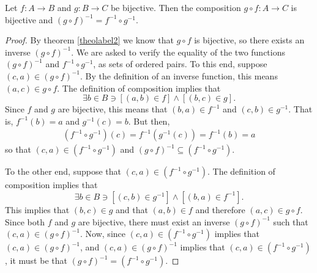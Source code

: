 \begin{theorem}
	Let $f:A\rightarrow B$ and $g:B\rightarrow C$ be bijective. Then the composition $g\circ f:A\rightarrow C$ is bijective and $(g\circ f)^{-1}=f^{-1}\circ g^{-1}$.
\end{theorem}

\begin{proof}
	By theorem \ref{theolabel2} we know that $g\circ f$ is bijective, so there exists an inverse $(g\circ f)^{-1}$. We are asked to verify the equality of the two functions $(g\circ f)^{-1}$ and $f^{-1}\circ g^{-1}$, as sets of ordered pairs. To this end, suppose $(c,a)\in (g\circ f)^{-1}$. By the definition of an inverse function, this means $(a,c)\in g\circ f$. The definition of composition implies that
	$$\exists b\in B \ni [(a,b)\in f]\land [(b,c)\in g].$$
	Since $f$ and $g$ are bijective, this means that $(b,a)\in f^{-1}$ and $(c,b)\in g^{-1}$. That is, $f^{-1}(b)=a$ and $g^{-1}(c)=b$. But then,
	\begin{align}
		(f^{-1}\circ g^{-1})(c)=f^{-1}(g^{-1}(c))=f^{-1}(b)=a
	\end{align}
	so that $(c,a)\in (f^{-1}\circ g^{-1})$ and $(g\circ f)^{-1}\subseteq (f^{-1}\circ g^{-1})$.
	
	To the other end, suppose that $(c,a)\in (f^{-1}\circ g^{-1})$. The definition of composition implies that 
	$$\exists b\in B \ni [(c,b)\in g^{-1}]\land [(b,a)\in f^{-1}].$$
	This implies that $(b,c)\in g$ and that $(a,b)\in f$ and therefore $(a,c)\in g\circ f$. Since both $f$ and $g$ are bijective, there must exist an inverse $(g\circ f)^{-1}$ such that $(c,a)\in (g\circ f)^{-1}$. Now, since $(c,a)\in (f^{-1}\circ g^{-1})$ implies that $(c,a)\in (g\circ f)^{-1}$, and $(c,a)\in (g\circ f)^{-1}$ implies that $(c,a)\in (f^{-1}\circ g^{-1})$, it must be that $(g\circ f)^{-1} = (f^{-1}\circ g^{-1})$.
\end{proof}






























































